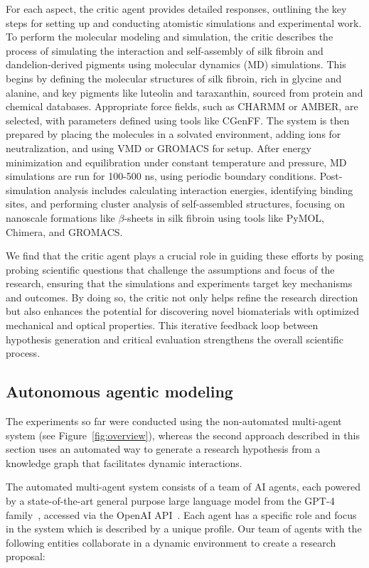 \documentclass{article}
\begin{document}
For each aspect, the critic agent provides detailed responses, outlining the key steps for setting up and conducting atomistic simulations and experimental work. To perform the molecular modeling and simulation, the critic describes the process of simulating the interaction and self-assembly of silk fibroin and dandelion-derived pigments using molecular dynamics (MD) simulations. This begins by defining the molecular structures of silk fibroin, rich in glycine and alanine, and key pigments like luteolin and taraxanthin, sourced from protein and chemical databases. Appropriate force fields, such as CHARMM or AMBER, are selected, with parameters defined using tools like CGenFF. The system is then prepared by placing the molecules in a solvated environment, adding ions for neutralization, and using VMD or GROMACS for setup. After energy minimization and equilibration under constant temperature and pressure, MD simulations are run for 100-500 ns, using periodic boundary conditions. Post-simulation analysis includes calculating interaction energies, identifying binding sites, and performing cluster analysis of self-assembled structures, focusing on nanoscale formations like $\beta$-sheets in silk fibroin using tools like PyMOL, Chimera, and GROMACS.

We find that the critic agent plays a crucial role in guiding these efforts by posing probing scientific questions that challenge the assumptions and focus of the research, ensuring that the simulations and experiments target key mechanisms and outcomes. By doing so, the critic not only helps refine the research direction but also enhances the potential for discovering novel biomaterials with optimized mechanical and optical properties. This iterative feedback loop between hypothesis generation and critical evaluation strengthens the overall scientific process.

\subsection{Autonomous agentic modeling}

The experiments so far were conducted using the non-automated multi-agent system (see Figure~\ref{fig:overview}), whereas the second approach described in this section uses an automated way to generate a research hypothesis from a knowledge graph that facilitates dynamic interactions. 

The automated multi-agent system consists of a team of AI agents, each powered by
a state-of-the-art general purpose large language model from the GPT-4 family~\cite{OpenAI2023},
accessed via the OpenAI API~\cite{OpenAI_API}. Each agent has a specific role and focus in the system which is described by a unique profile. Our team of agents with the following entities collaborate in a dynamic environment to create a research proposal:
\end{document}

